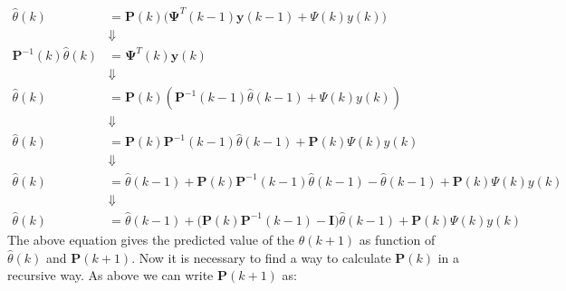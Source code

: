 \documentclass[12pt,a4paper,oneside]{book}
\begin{document}
\begin{onehalfspace}
\begin{equation}
	\begin{aligned}
		\hat{\theta}(k) &= 
		\mathbf{P}(k)\Big(\mathbf{\Psi}^T(k-1)\mathbf{y}(k-1)+\Psi(k)y(k)\Big) 
		\\[6pt]
		& \Downarrow \\[6pt]
		\mathbf{P}^{-1}(k)\hat{\theta}(k) &= \mathbf{\Psi}^T(k)\mathbf{y}(k) 
		\\[6pt]
		& \Downarrow \\[6pt]
		\hat{\theta}(k) &= 
		\mathbf{P}(k)\left(\mathbf{P}^{-1}(k-1)\hat{\theta}(k-1)+\Psi(k)y(k)\right)
		 \\[6pt]
		& \Downarrow \\[6pt]
		\hat{\theta}(k) &= 
		\mathbf{P}(k)\mathbf{P}^{-1}(k-1)\hat{\theta}(k-1)+\mathbf{P}(k)\Psi(k)y(k)
		 \\[6pt]
		& \Downarrow \\[6pt]
		\hat{\theta}(k) &= 
		\hat{\theta}(k-1)+\mathbf{P}(k)\mathbf{P}^{-1}(k-1)\hat{\theta}(k-1)-\hat{\theta}(k-1)+\mathbf{P}(k)\Psi(k)y(k)
		 \\[6pt]
		& \Downarrow \\[6pt]
		\hat{\theta}(k) &= 
		\hat{\theta}(k-1)+\Big(\mathbf{P}(k)\mathbf{P}^{-1}(k-1)-\mathbf{I}\Big)\hat{\theta}(k-1)+\mathbf{P}(k)\Psi(k)y(k)
	\end{aligned}
\end{equation}
The above equation gives the predicted value of the $\hat{\theta}(k+1)$ as 
function of $\hat{\theta}(k)$ and $\mathbf{P}(k+1)$.
Now it is necessary to find a way to calculate $\mathbf{P}(k)$ in a recursive 
way.
As above we can write $\mathbf{P}(k+1)$ as: 


\end{onehalfspace}
\end{document}
